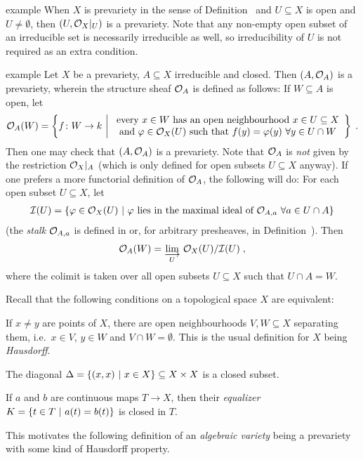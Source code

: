 \documentclass[a4paper,parskip=half,numbers=enddot, DIV=12]{scrreprt}
\begin{document}
\begin{varthm}{example}
 When $X$ is prevariety in the sense of Definition~ and $U\subseteq X$ is open and $U\neq \emptyset$, then $(U,\mathcal{O}_X|_U)$ is a prevariety. Note that any non-empty open subset of an irreducible set is necessarily irreducible as well, so irreducibility of $U$ is not required as an extra condition.
\end{varthm}
\begin{varthm}[b]{example}
 Let $X$ be a prevariety, $A\subseteq X$ irreducible and closed. Then $(A,\mathcal{O}_A)$ is a prevariety, wherein the structure sheaf $\mathcal{O}_A$ is defined as follows: If $W\subseteq A$ is open, let
 \begin{align*}
    \Oo_A(W) = \left\{ f\colon W\to k \st 
    \begin{array}{c}
	    \text{every } x\in W\text{ has an open neighbourhood } x\in U\subseteq X  \\
	    \text{and } \phi\in \Oo_X(U)\text{ such that } f(y) = \phi(y)\ \forall y\in U\cap W
    \end{array}\right\}\;.
 \end{align*}
 Then one may check that $(A,\mathcal{O}_A)$ is a prevariety. Note that $\mathcal{O}_A$ is \emph{not} given by the restriction $\mathcal{O}_X|_A$ (which is only defined for open subsets $U\subseteq X$ anyway). If one prefers a more functorial definition of $\mathcal{O}_A$, the following will do: For each open subset $U\subseteq X$, let 
 \begin{align*}
 	\mathcal{I}(U)=\left\{\varphi\in\mathcal{O}_X(U)\ \middle|\  \varphi\text{ lies in the maximal ideal of }\mathcal{O}_{A,a}\ \forall a\in U\cap A\right\}
 \end{align*}
 (the \emph{stalk} $\mathcal{O}_{A,a}$ is defined in \cite[Definition 2.2.5]{alg1} or, for arbitrary presheaves, in Definition~). Then
 \begin{align*}
 	\Oo_A(W)=\colimit[U] \Oo_X(U)/\Ii(U)\;,
 \end{align*}
	where the colimit is taken over all open subsets $U\subseteq X$ such that $U\cap A=W$.
\end{varthm}

\begin{rem*}
 Recall that the following conditions on a topological space $X$ are equivalent:
 \begin{alphanumerate}
  \item
    If $x\neq y$ are points of $X$, there are open neighbourhoods $V,W\subseteq X$ separating them, i.e.\ $x\in V$, $y\in W$ and $V\cap W= \emptyset$. This is the usual definition for $X$ being \emph{Hausdorff}.
  \item
    The diagonal $\Delta = \left\{(x,x)\ \middle|\  x\in X\right\}\subseteq X\times X$ is a closed subset.
  \item 
    If $a$ and $b$ are continuous maps $T\to X$, then their \emph{equalizer} $K = \left\{t\in T\ \middle|\  a(t) = b(t)\right\}$ is closed in $T$.
 \end{alphanumerate}
This motivates the following definition of an \emph{algebraic variety} being a prevariety with some kind of Hausdorff property.
\end{rem*}
\end{document}
